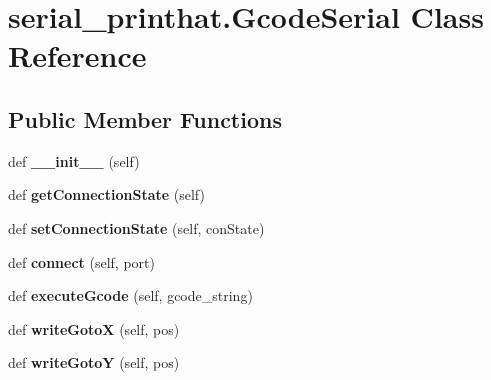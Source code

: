 \hypertarget{classserial__printhat_1_1_gcode_serial}{}\section{serial\+\_\+printhat.\+Gcode\+Serial Class Reference}
\label{classserial__printhat_1_1_gcode_serial}
\subsection*{Public Member Functions}
\begin{DoxyCompactItemize}
\item 
def {\bfseries \+\_\+\+\_\+init\+\_\+\+\_\+} (self)\hypertarget{classserial__printhat_1_1_gcode_serial_a286246832bdf1bc8dcf5ff82bdd74e6e}{}\label{classserial__printhat_1_1_gcode_serial_a286246832bdf1bc8dcf5ff82bdd74e6e}

\item 
def {\bfseries get\+Connection\+State} (self)\hypertarget{classserial__printhat_1_1_gcode_serial_a7402f098d751c69091a548d443abf72a}{}\label{classserial__printhat_1_1_gcode_serial_a7402f098d751c69091a548d443abf72a}

\item 
def {\bfseries set\+Connection\+State} (self, con\+State)\hypertarget{classserial__printhat_1_1_gcode_serial_a61995760948f024f83e28e0f0b0864ee}{}\label{classserial__printhat_1_1_gcode_serial_a61995760948f024f83e28e0f0b0864ee}

\item 
def {\bfseries connect} (self, port)\hypertarget{classserial__printhat_1_1_gcode_serial_a063eebd788e44d601f4d0e1836dab3a9}{}\label{classserial__printhat_1_1_gcode_serial_a063eebd788e44d601f4d0e1836dab3a9}

\item 
def {\bfseries execute\+Gcode} (self, gcode\+\_\+string)\hypertarget{classserial__printhat_1_1_gcode_serial_ac2da6000d16d939ee07933f4725cbec8}{}\label{classserial__printhat_1_1_gcode_serial_ac2da6000d16d939ee07933f4725cbec8}

\item 
def {\bfseries write\+GotoX} (self, pos)\hypertarget{classserial__printhat_1_1_gcode_serial_af5c18284e4e134be9d44b3b5b8be3058}{}\label{classserial__printhat_1_1_gcode_serial_af5c18284e4e134be9d44b3b5b8be3058}

\item 
def {\bfseries write\+GotoY} (self, pos)\hypertarget{classserial__printhat_1_1_gcode_serial_a7dd06397191df90fab761fc97b87623f}{}\label{classserial__printhat_1_1_gcode_serial_a7dd06397191df90fab761fc97b87623f}


\end{DoxyCompactItemize}
